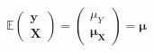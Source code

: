 \begin{equation}
	\mathbb{E}
	\left(
		\begin{array}{c}
			\mathbf{y} \\
			\mathbf{X} 
		\end{array}
	\right)
	=
	\left(
		\begin{array}{c}
			\mu_{Y}                       \\
			\boldsymbol{\mu}_{\mathbf{X}} 
		\end{array}
	\right)
	=
	\boldsymbol{\mu}
	\label{eq:strRegression-expected-values}
\end{equation}
